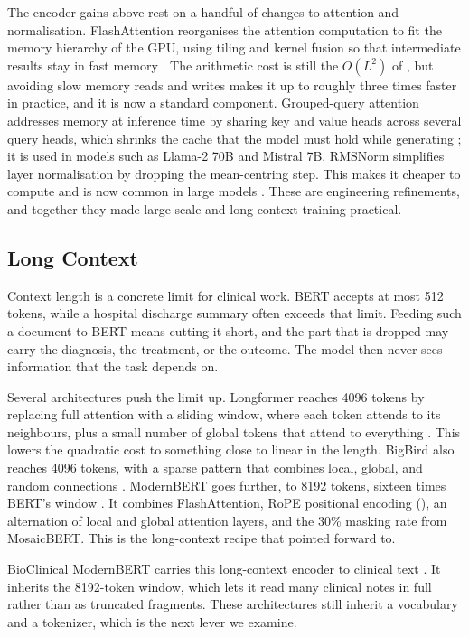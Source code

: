 The encoder gains above rest on a handful of changes to attention and normalisation.
FlashAttention reorganises the attention computation to fit the memory hierarchy of the
GPU, using tiling and kernel fusion so that intermediate results stay in fast memory
\citep{dao2022flashattention}. The arithmetic cost is still the $O(L^2)$ of
, but avoiding slow memory reads and writes makes it up to roughly three
times faster in practice, and it is now a standard component. Grouped-query attention
addresses memory at inference time by sharing key and value heads across several query
heads, which shrinks the cache that the model must hold while generating
\citep{ainslie-etal-2023-gqa}; it is used in models such as Llama-2 70B and Mistral 7B. RMSNorm
simplifies layer normalisation by dropping the mean-centring step. This makes it cheaper
to compute and is now common in large models \citep{zhang2019rmsnorm}. These are
engineering refinements, and together they made large-scale and long-context
training practical.

\subsection{Long Context}

Context length is a concrete limit for clinical work. BERT accepts at most 512 tokens,
while a hospital discharge summary often exceeds that limit. Feeding such a document to
BERT means cutting it short, and the part that is dropped may carry the diagnosis, the
treatment, or the outcome. The model then never sees information that the task depends on.

Several architectures push the limit up. Longformer reaches 4096 tokens by replacing full
attention with a sliding window, where each token attends to its neighbours, plus a small
number of global tokens that attend to everything \citep{beltagy2020longformer}. This
lowers the quadratic cost to something close to linear in the length. BigBird also reaches
4096 tokens, with a sparse pattern that combines local, global, and random connections
\citep{zaheer2020bigbird}. ModernBERT goes further, to 8192 tokens, sixteen times BERT's
window \citep{modernbert}. It combines FlashAttention, RoPE positional encoding
(), an alternation of local and global attention layers, and the
30\% masking rate from MosaicBERT. This is the long-context recipe that
 pointed forward to.

BioClinical ModernBERT carries this long-context encoder to clinical text
\citep{sounack2025bioclinicalmodernbert}. It inherits the 8192-token window, which lets it
read many clinical notes in full rather than as truncated fragments. These architectures still
inherit a vocabulary and a tokenizer, which is the next lever we examine.
